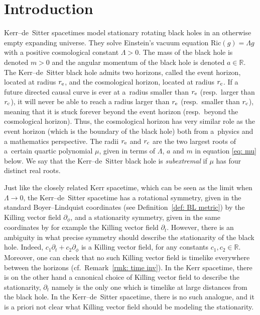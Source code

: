 \documentclass[pdftex]{sigma}
\newcommand{\Ric}{\mathrm{Ric}}
\renewcommand{\d}{\partial}
\newcommand{\R}[0]{\mathbb{R}}
\numberwithin{equation}{section}
\begin{document}


\renewcommand{\thefootnote}{\arabic{footnote}}
\setcounter{footnote}{0}

\section{Introduction}

Kerr--de~Sitter spacetimes model stationary rotating black holes in an otherwise empty expanding universe.
They solve Einstein's vacuum equation $\Ric(g) = \Lambda g$ with a positive cosmological constant $\Lambda > 0$.
The mass of the black hole is denoted $m > 0$ and the angular momentum of the black hole is denoted $a \in \R$.
The Kerr--de~Sitter black hole admits two horizons, called the event horizon, located at radius $r_{\rm e}$, and the cosmological horizon, located at radius $r_{\rm c}$.
If a future directed causal curve is ever at a~radius smaller than $r_{\rm e}$ (resp.~larger than $r_{\rm c}$), it will never be able to reach a radius larger than $r_{\rm e}$ (resp.~smaller than $r_{\rm c}$), meaning that it is stuck forever beyond the event horizon (resp.~beyond the cosmological horizon).
Thus, the cosmological horizon has very similar role as the event horizon (which is the boundary of the black hole) both from a~physics and a mathematics perspective.
The radii $r_{\rm e}$ and $r_{\rm c}$ are the two largest roots of a~certain quartic polynomial $\mu$, given in terms of $\Lambda$, $a$ and $m$ in equation \eqref{eq: mu} below.
We say that the Kerr--de~Sitter black hole is \emph{subextremal} if $\mu$ has four distinct real roots.

Just like the closely related Kerr spacetime, which can be seen as the limit when $\Lambda \to 0$, the Kerr--de~Sitter spacetime has a rotational symmetry, given in the standard Boyer--Lindquist coordinates (see Definition~\ref{def: BL metric}) by the Killing vector field $\d_\phi$, and a stationarity symmetry, given in the same coordinates by for example the Killing vector field $\d_t$.
However, there is an ambiguity in what precise symmetry should describe the stationarity of the black hole.
Indeed,
$c_1 \d_t + c_2 \d_\phi$
is a Killing vector field, for any constants $c_1, c_2 \in \R$.
Moreover, one can check that no such Killing vector field is timelike everywhere between the horizons (cf.~Remark~\ref{rmk: time inv}).
In the Kerr spacetime, there is on the other hand a canonical choice of Killing vector field to describe the stationarity, $\d_t$ namely is the only one which is timelike at large distances from the black hole.
In the Kerr--de~Sitter spacetime, there is no such analogue, and it is a priori not clear what Killing vector field should be modeling the stationarity.
\end{document}
